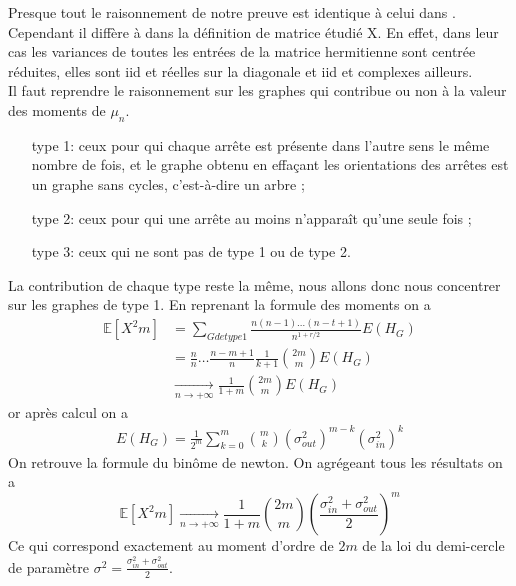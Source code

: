Presque tout le raisonnement de notre preuve est identique à celui dans \cite[Introduction aux matrices aléatoires]{wigner}. 
Cependant il diffère à dans la définition de matrice étudié X.
En effet, dans leur cas les variances de toutes les entrées de la matrice hermitienne sont centrée réduites, elles sont iid et réelles sur la diagonale et iid et complexes ailleurs.\\
Il faut reprendre le raisonnement sur les graphes qui contribue ou non à la valeur des moments de $\mu_n$. 
\begin{itemize}
\item[type 1:] ceux pour qui chaque arrête est présente dans l’autre sens le même nombre de fois, et le graphe obtenu en effaçant les orientations des arrêtes est un graphe sans cycles, c’est-à-dire un arbre ;
\item[type 2:] ceux pour qui une arrête au moins n’apparaît qu’une seule fois ;
\item[type 3:] ceux qui ne sont pas de type 1 ou de type 2.
\end{itemize}

La contribution de chaque type reste la même, nous allons donc nous concentrer sur les graphes de type 1.
En reprenant la formule des moments on a 
\begin{align*}
	\mathbb{E}[X^2m] &= \sum_{G de type 1} \frac{n(n-1)\dots(n-t+1)}{n^{1 + r/2 }}E(H_{G})\\
	&= \frac{n}{n} \dots \frac{n-m+1}{n} \frac{1}{k+1} \binom{2m}{m} E(H_{G})\\
	&\xrightarrow[n \to +\infty]{} \frac{1}{1 + m}\binom{2m}{m} E(H_{G})
\end{align*}
or après calcul on a 
\begin{align*}
	E(H_{G}) = \frac{1}{2^m} \sum_{k=0}^{m} \binom{m}{k}(\sigma_{out}^2)^{m-k} (\sigma_{in}^2)^k
\end{align*}
On retrouve la formule du binôme de newton.
On agrégeant tous les résultats on a 
\begin{equation}
 	\boxed{\mathbb{E}[X^2m] \xrightarrow[n \to +\infty]{} \frac{1}{1 + m}\binom{2m}{m} (\frac{\sigma_{in}^2 + \sigma_{out}^2}{2})^m}
\end{equation} 
Ce qui correspond exactement au moment d'ordre de $2m$ de la loi du demi-cercle de paramètre $\sigma^2 = \frac{\sigma_{in}^2 + \sigma_{out}^2}{2}$.